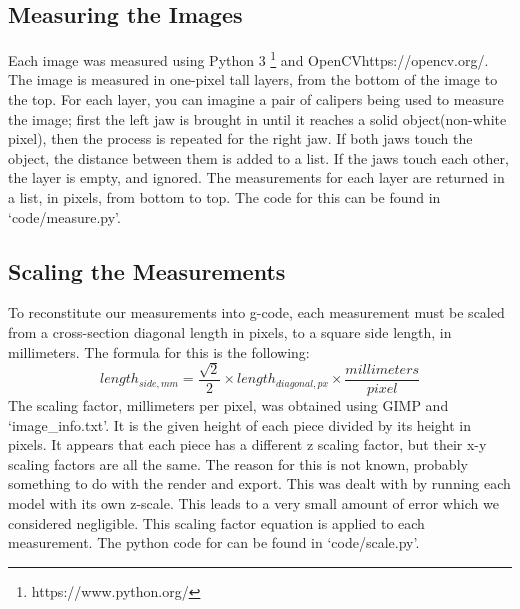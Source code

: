 \documentclass{IEEEtran}
\begin{document}
        \subsection{Measuring the Images}
            Each image was measured using Python 3 \footnote{https://www.python.org/} and OpenCV{https://opencv.org/}.  The image is measured in one-pixel tall layers, from the bottom
            of the image to the top.  For each layer, you can imagine a pair of calipers being used to measure the image; first the left jaw is brought in until it reaches a
            solid object(non-white pixel), then the process is repeated for the right jaw.  If both jaws touch the object, the distance between them is added to a list. If the jaws
            touch each other, the layer is empty, and ignored.  The measurements for each layer are returned in a list, in pixels, from bottom to top.  The code for this can be found in `code/measure.py'.
            
        \subsection{Scaling the Measurements}
            To reconstitute our measurements into g-code, each measurement must be scaled from a cross-section diagonal length in pixels, to a square side length, in millimeters.
            The formula for this is the following:
            $$ length_{side,mm} = \frac{\sqrt{2}}{2} \times length_{diagonal,px} \times \frac{millimeters}{pixel} $$
            The scaling factor, millimeters per pixel, was obtained using GIMP and `image\_info.txt'.  It is the given height of each piece divided by its height in pixels.  It appears
            that each piece has a different z scaling factor, but their x-y scaling factors are all the same.  The reason for this is not known, probably something to do with the render
            and export.  This was dealt with by running each model with its own z-scale.  This leads to a very small amount of error which we considered negligible.
            This scaling factor equation is applied to each measurement.  The python code for can be found in `code/scale.py'.
\end{document}
